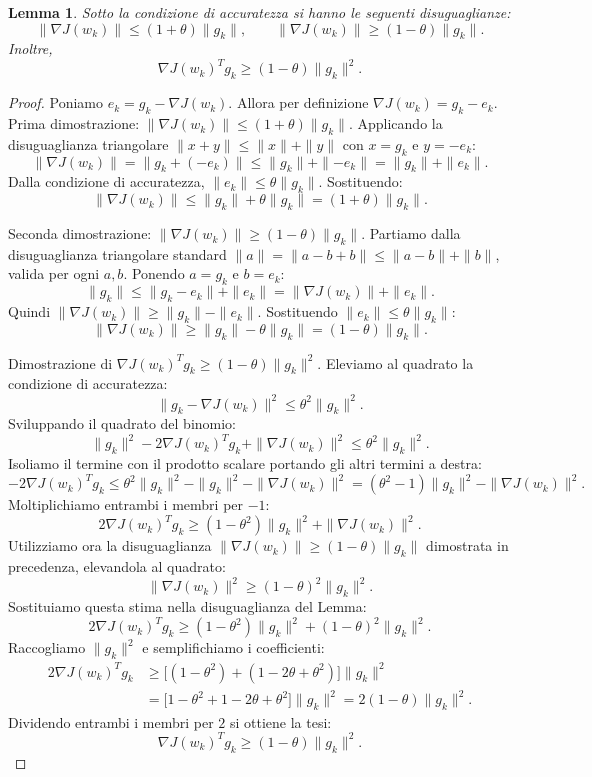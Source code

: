 \documentclass[a4paper,12pt]{article}
\numberwithin{equation}{section}
\numberwithin{figure}{section}
\numberwithin{table}{section}
\newtheorem{lemma}{Lemma}
\begin{document}
\begin{lemma}\label{lem:accuratezza}
  Sotto la condizione di accuratezza si hanno le seguenti disuguaglianze:
  \[
  \|\nabla J(w_k)\| \leq (1+\theta)\|g_k\|, \qquad
  \|\nabla J(w_k)\| \geq (1-\theta)\|g_k\|.
  \]
  Inoltre,
  \[
  \nabla J(w_k)^T g_k \geq (1-\theta)\|g_k\|^2.
  \]
\end{lemma}
\begin{proof}
  Poniamo $e_k = g_k - \nabla J(w_k)$. Allora per definizione $\nabla J(w_k) = g_k - e_k$.
  Prima dimostrazione: $\|\nabla J(w_k)\| \leq (1+\theta)\|g_k\|$.
  Applicando la disuguaglianza triangolare $\|x+y\| \leq \|x\| + \|y\|$ con $x = g_k$ e $y = -e_k$:
  \[
  \|\nabla J(w_k)\| = \|g_k + (-e_k)\| \leq \|g_k\| + \|{-e_k}\| = \|g_k\| + \|e_k\|.
  \]
  Dalla condizione di accuratezza, $\|e_k\| \leq \theta \|g_k\|$. Sostituendo:
  \[
  \|\nabla J(w_k)\| \leq \|g_k\| + \theta \|g_k\| = (1+\theta)\|g_k\|.
  \]

  Seconda dimostrazione: $\|\nabla J(w_k)\| \geq (1-\theta)\|g_k\|$.
  Partiamo dalla disuguaglianza triangolare standard $\|a\|=\|a-b+b\| \leq \|a-b\| + \|b\|$, valida per ogni $a,b$. Ponendo $a = g_k$ e $b = e_k$:
  \[
  \|g_k\| \leq \|g_k - e_k\| + \|e_k\| = \|\nabla J(w_k)\| + \|e_k\|.
  \]
  Quindi $\|\nabla J(w_k)\| \geq \|g_k\| - \|e_k\|$. Sostituendo $\|e_k\| \leq \theta \|g_k\|$:
  \[
  \|\nabla J(w_k)\| \geq \|g_k\| - \theta \|g_k\| = (1-\theta)\|g_k\|.
  \]

  Dimostrazione di $\nabla J(w_k)^T g_k \geq (1-\theta)\|g_k\|^2$.
  Eleviamo al quadrato la condizione di accuratezza:
  \[
  \|g_k - \nabla J(w_k)\|^2 \leq \theta^2 \|g_k\|^2.
  \]
  Sviluppando il quadrato del binomio:
  \[
  \|g_k\|^2 - 2\nabla J(w_k)^T g_k + \|\nabla J(w_k)\|^2 \leq \theta^2 \|g_k\|^2.
  \]
  Isoliamo il termine con il prodotto scalare portando gli altri termini a destra:
  \[
  -2\nabla J(w_k)^T g_k \leq \theta^2 \|g_k\|^2 - \|g_k\|^2 - \|\nabla J(w_k)\|^2 = (\theta^2 - 1)\|g_k\|^2 - \|\nabla J(w_k)\|^2.
  \]
  Moltiplichiamo entrambi i membri per $-1$:
  \[
  2\nabla J(w_k)^T g_k \geq (1 - \theta^2)\|g_k\|^2 + \|\nabla J(w_k)\|^2.
  \]
  Utilizziamo ora la disuguaglianza $\|\nabla J(w_k)\| \geq (1-\theta)\|g_k\|$ dimostrata in precedenza, elevandola al quadrato:
  \[
  \|\nabla J(w_k)\|^2 \geq (1-\theta)^2 \|g_k\|^2.
  \]
  Sostituiamo questa stima nella disuguaglianza del Lemma:
  \[
  2\nabla J(w_k)^T g_k \geq (1 - \theta^2)\|g_k\|^2 + (1-\theta)^2 \|g_k\|^2.
  \]
  Raccogliamo $\|g_k\|^2$ e semplifichiamo i coefficienti:
  \[
  \begin{aligned}
  2\nabla J(w_k)^T g_k
  &\geq \bigl[(1 - \theta^2) + (1 - 2\theta + \theta^2)\bigr] \|g_k\|^2 \\
  &= \bigl[1 - \theta^2 + 1 - 2\theta + \theta^2\bigr] \|g_k\|^2
   = 2(1 - \theta) \|g_k\|^2.
  \end{aligned}
  \]
  Dividendo entrambi i membri per $2$ si ottiene la tesi:
  \[
  \nabla J(w_k)^T g_k \geq (1-\theta) \|g_k\|^2.
  \]
\end{proof}
\end{document}
